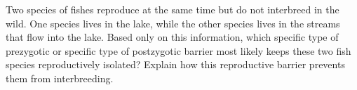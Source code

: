 \showpoints
\question[5]
Two species of fishes reproduce at the same time but do not interbreed in the wild. One species lives in the lake, while the other species lives in the streams that flow into the lake.  Based only on this information, which specific type of prezygotic or specific type of postzygotic barrier most likely keeps these two fish species reproductively isolated? Explain how this reproductive barrier prevents them from interbreeding. 

